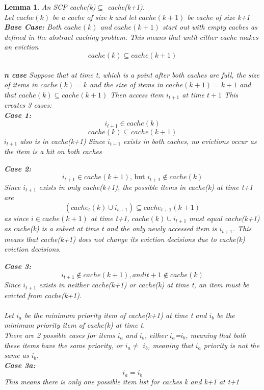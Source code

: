 \newtheorem{theorem}{Theorem}[section]
\newtheorem{corollary}{Corollary}[theorem]
\newtheorem{lemma}[theorem]{Lemma}
\newtheorem{definition}{Definition}[section]
\begin{lemma}
An SCP cache(k)$\subseteq$ cache(k+1). \\ Let
$cache(k)$ be a cache of size k and let $cache(k+1)$ be cache of size k+1 \\

\textbf{Base Case:}
Both $cache(k)$ and $cache(k+1)$ start out with empty caches as defined in the abstract caching problem. This means that until either cache makes an eviction
\[cache(k) \subseteq cache(k+1)\]
\\
\textbf{n case}
Suppose that at time t, which is a point after both caches are full, the size of items in $cache(k) = k$ and the size of items in $cache(k+1)=k+1$ and that $cache(k) \subseteq cache(k+1)$
Then access item $i_{t+1}$ at time $t+1$
This creates 3 cases:\\
\textbf{Case 1:}
\[i_{t+1} \in cache(k)\] \[cache(k) \subseteq cache(k+1)\] $i_{t+1}$ also is in cache(k+1)
Since $i_{t+1}$ exists in both caches, no evictions occur as the item is a hit on both caches

\textbf{Case 2:}
\[i_{t+1} \in cache(k+1)\text{, but } i_{t+1} \notin cache(k)\]
Since $i_{t+1}$ exists in only cache(k+1), the possible items in cache(k) at time t+1 are
\[(cache_{t}(k) \cup i_{t+1}) \subseteq cache_{t+1}(k+1)\]
as since $i \in cache(k+1)$ at time t+1, $cache(k) \cup i_{t+1}$ must equal cache(k+1) as cache(k) is a subset at time t and the only newly accessed item is $i_{t+1}$. This means that cache(k+1) does not change its eviction decisions due to cache(k) eviction decisions.  

\textbf{Case 3:}
\[i_{t+1} \notin cache(k+1), and i{t+1} \notin cache(k)\]
Since $i_{t+1}$ exists in neither cache(k+1) or cache(k) at time t, an item must be evicted from cache(k+1). \\ \\
Let $i_a$ be the minimum priority item of cache(k+1) at time t and $i_b$ be the minimum priority item of cache(k) at time t.\\
There are 2 possible cases for items $i_a$ and $i_b$, either $i_a$=$i_b$, meaning that both these items have the same priority, or $i_a \neq$ $i_b$, meaning that $i_a$ priority is not the same as $i_b$.\\

\textbf{Case 3a:}
\[i_a=i_b\]
This means there is only one possible item list for caches k and k+1 at t+1


\end{lemma}
